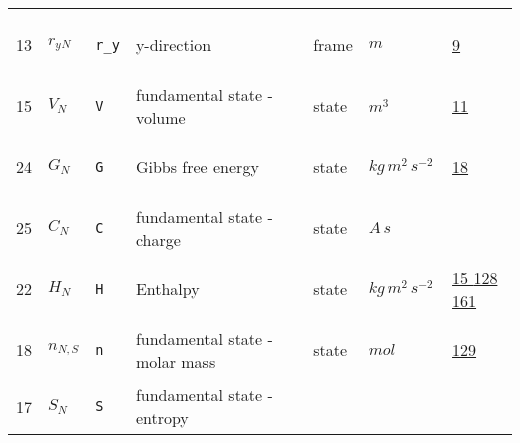 \begin{longtable}{|p{1cm}|p{2.5cm}|p{4.5cm}|p{8cm}|p{3.0cm}|p{3cm}|p{1cm}|}
             & \\
            13
             & \hypertarget{"v:13"}{ $ {{r_y}}{_{N}} $}
             & \verb|r_y|
             & y-direction
             & \begin{lay}frame \end{lay}
             & $ m  $
             &                 \hyperlink{"e:9"}{ 9 }
                 \\
            15
             & \hypertarget{"v:15"}{ $ {V}{_{N}} $}
             & \verb|V|
             & fundamental state - volume
             & \begin{lay}state \end{lay}
             & $ m^{3} \, $
             &                 \hyperlink{"e:11"}{ 11 }
                 \\
            24
             & \hypertarget{"v:24"}{ $ {G}{_{N}} $}
             & \verb|G|
             & Gibbs free energy
             & \begin{lay}state \end{lay}
             & $ kg \,m^{2} \,s^{-2} \, $
             &                 \hyperlink{"e:18"}{ 18 }
                 \\
            25
             & \hypertarget{"v:25"}{ $ {C}{_{N}} $}
             & \verb|C|
             & fundamental state - charge
             & \begin{lay}state \end{lay}
             & $ A \,s \, $
             & \\
            22
             & \hypertarget{"v:22"}{ $ {H}{_{N}} $}
             & \verb|H|
             & Enthalpy
             & \begin{lay}state \end{lay}
             & $ kg \,m^{2} \,s^{-2} \, $
             &                 \hyperlink{"e:15"}{ 15 }
                                 \hyperlink{"e:128"}{ 128 }
                                 \hyperlink{"e:161"}{ 161 }
                 \\
            18
             & \hypertarget{"v:18"}{ $ {n}{_{N, S}} $}
             & \verb|n|
             & fundamental state - molar mass
             & \begin{lay}state \end{lay}
             & $ mol \, $
             &                 \hyperlink{"e:129"}{ 129 }
                 \\
            17
             & \hypertarget{"v:17"}{ $ {S}{_{N}} $}
             & \verb|S|
             & fundamental state - entropy

\end{longtable}

